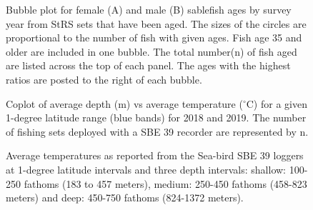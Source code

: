 \documentclass[12pt]{article}\usepackage[]{graphicx}\usepackage[]{color}
\begin{document}
\begin{figure}[htb]

{\centering {} 

}

\caption{Bubble plot for female (A) and male (B) sablefish ages by survey year from StRS sets that have been aged. The sizes of the circles are proportional to the number of fish with given ages. Fish age 35 and older are included in one bubble. The total number(n) of fish aged are listed across the top of each panel. The ages with the highest ratios are posted to the right of each bubble.}\label{fig:figure13}
\end{figure}
\clearpage


\begin{figure}[htb]

{\centering {} 

}

\caption{Coplot of average depth (m) vs average temperature (\(^\circ\)C) for a given 1-degree latitude range (blue bands) for 2018 and 2019. The number of fishing sets deployed with a SBE 39 recorder are represented by n.}\label{fig:figure14}
\end{figure}
\clearpage


\begin{figure}[htb]

{\centering {} 

}

\caption{Average temperatures as reported from the Sea-bird SBE 39 loggers at 1-degree latitude intervals and three depth intervals: shallow: 100-250 fathoms (183 to 457 meters), medium: 250-450 fathoms (458-823 meters) and deep: 450-750 fathoms (824-1372 meters).}\label{fig:figure15}
\end{figure}
\clearpage
\end{document}
